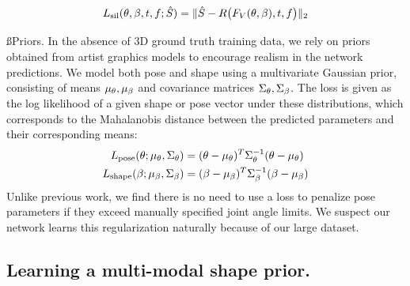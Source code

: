 \begin{equation}
L_{\textrm{sil}}(\theta, \beta, t, f; \hat{S}) = \lVert \hat{S} - R\bigl(F_{V}(\theta, \beta), t, f \bigr) \rVert_{2}
\end{equation}


\ss{Priors.}
In the absence of 3D ground truth training data, we rely on priors obtained from artist graphics models to encourage realism in the network predictions. We model both pose and shape using a multivariate Gaussian prior, consisting of means $\mu_{\theta},\mu_{\beta}$ and covariance matrices $\Sigma_{\theta},\Sigma_{\beta}$. The loss is given as the log likelihood of a given shape or pose vector under these distributions, which corresponds to the Mahalanobis distance between the predicted parameters and their corresponding means:
\begin{align}
    L_{\textrm{pose}}(\theta; \mu_{\theta}, \Sigma_{\theta}) &= (\theta - \mu_{\theta})^T \Sigma_{\theta}^{-1} (\theta - \mu_{\theta})\\
    L_{\textrm{shape}}(\beta; \mu_{\beta}, \Sigma_{\beta}) &= (\beta - \mu_{\beta})^T \Sigma_{\beta}^{-1} (\beta - \mu_{\beta})
\end{align}
Unlike previous work, we find there is no need to use a loss to penalize pose parameters if they exceed manually specified joint angle limits. We suspect our network learns this regularization naturally because of our large dataset.



\subsection{Learning a multi-modal shape prior.}



